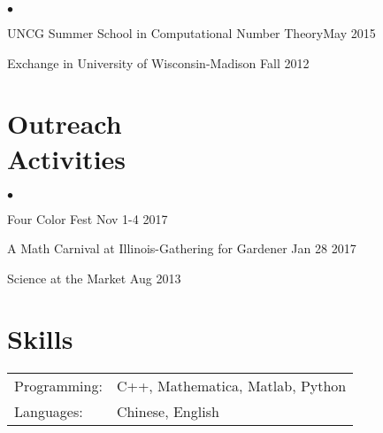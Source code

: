 \documentclass[margin,line,pifont,palatino,courier,10pt]{res}
\newenvironment{list1}{
  \begin{list}{$\bullet$}{%
      \setlength{\itemsep}{0in}
      \setlength{\parsep}{0in} \setlength{\parskip}{0in}
      \setlength{\topsep}{0in} \setlength{\partopsep}{0in}
      \setlength{\leftmargin}{0.17in}}}{\end{list}}
\begin{document}
\begin{resume}
\begin{list1}
\item  UNCG Summer School in Computational Number Theory{\hfill  May 2015}

\item  Exchange in {University of Wisconsin-Madison}    {\hfill   Fall 2012}
%	
%
%	
\end{list1}

\section{\sc Outreach \\Activities }
\begin{list1}
\item Four Color Fest {\hfill  Nov 1-4 2017}
\item A Math Carnival at Illinois-Gathering for Gardener  {\hfill  Jan 28 2017}
\item Science at the Market {\hfill  Aug 2013}
\end{list1}
\section{\sc Skills}

\begin{tabular}{@{}p{0.8in}p{6in}}
	Programming: &  C++, Mathematica, Matlab, Python\\
	Languages:& Chinese, English
\end{tabular}


\end{resume}
\end{document}
